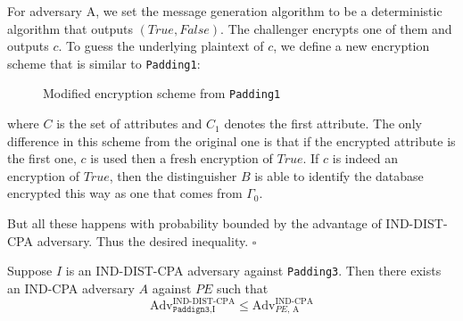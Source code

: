 For adversary A, we set the message generation algorithm to be a deterministic algorithm that outputs $(True, False)$. The challenger encrypts one of them and outputs $c$. To guess the underlying plaintext of $c$, we define a new encryption scheme that is similar to \texttt{Padding1}:
\begin{figure}[H]
	\begin{center}
	\end{center}
	\caption{Modified encryption scheme from \texttt{Padding1}}
\end{figure}
where $C$ is the set of attributes and $C_1$ denotes the first attribute. The only difference in this scheme from the original one is that if the encrypted attribute is the first one, $c$ is used then a fresh encryption of $True$. If $c$ is indeed an encryption of $True$, then the distinguisher $B$ is able to identify the database encrypted this way as one that comes from $\Gamma_0$.

But all these happens with probability bounded by the advantage of IND-DIST-CPA adversary. Thus the desired inequality. $\square$




\begin{theorem}
	Suppose $I$ is an IND-DIST-CPA adversary against \texttt{Padding3}. Then there exists an IND-CPA adversary $A$ against $PE$ such that
	\begin{equation}
	\text{Adv}_{\texttt{Paddign3}, \text{I}}^{\text{IND-DIST-CPA}} \leq \text{Adv}_{\text{$PE$, A}}^{\text{IND-CPA}}
	\end{equation}
\end{theorem}

